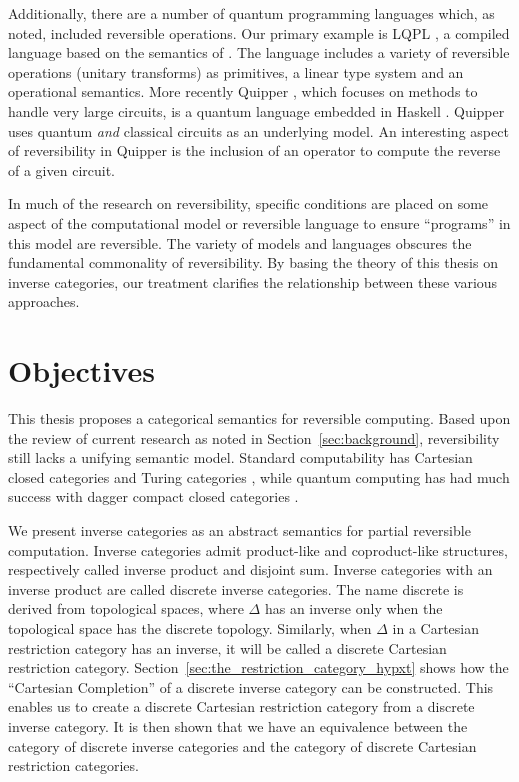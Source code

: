 Additionally, there are a number of quantum programming languages which, as noted, included
reversible operations. Our primary example is LQPL \cite{giles2007}, a compiled language based on the
semantics of \cite{selinger04:qpl}. The language includes a variety of reversible operations
(unitary transforms) as primitives, a linear type system and an operational semantics. More recently
Quipper \cite{green2013introduction,green2013quipper}, which focuses on methods to handle very large
circuits, is a quantum language embedded in Haskell \cite{peyton2003:haskell98}. Quipper uses quantum
\emph{and} classical circuits as an underlying model. An interesting aspect of reversibility in
Quipper is the inclusion of an operator to compute the reverse of a given circuit.

In much of the research on reversibility, specific conditions are placed on some aspect of the
computational model or reversible language to ensure ``programs'' in this model are reversible.
The variety of models and languages obscures the fundamental commonality of reversibility.
By basing the theory of this thesis on inverse categories, our treatment clarifies the relationship
between these various approaches.


\section{Objectives}
\label{sec:objectives}

This thesis proposes a categorical semantics for reversible computing. Based upon the review of
current research as noted in Section~\ref{sec:background}, reversibility still lacks a unifying
semantic model. Standard computability has Cartesian closed categories \cite{barr:ctcs} and Turing
categories \cite{cockett-hostra08-intro-to-turing}, while quantum computing has had much success
with dagger compact closed categories
\cite{selinger04:towardssemantics,selinger05:dagger,abramsky05:abstractscalars}.

We present inverse categories as an abstract semantics for partial reversible computation.
Inverse categories admit product-like and coproduct-like structures, respectively called
inverse product and disjoint sum. Inverse categories with an inverse product are called discrete
inverse categories. The name discrete is derived from topological spaces, where $\Delta$ has an
inverse only when the topological space has the discrete topology. Similarly, when
$\Delta$ in a Cartesian restriction category has an inverse, it will be called a discrete Cartesian
restriction category. Section~\ref{sec:the_restriction_category_hypxt} shows how the ``Cartesian
Completion'' of a discrete inverse category can be constructed. This enables us to create a discrete
Cartesian restriction category from a discrete inverse category. It is then shown that we have an
equivalence between the category of discrete inverse categories and the category of discrete
Cartesian restriction categories.

